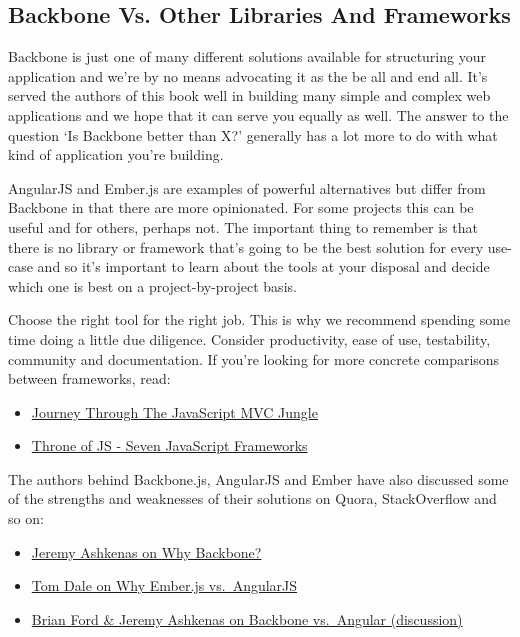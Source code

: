 \documentclass[9pt]{book}
\begin{document}
\subsection{Backbone Vs. Other Libraries And
Frameworks}\label{backbone-vs.-other-libraries-and-frameworks}

Backbone is just one of many different solutions available for
structuring your application and we're by no means advocating it as the
be all and end all. It's served the authors of this book well in
building many simple and complex web applications and we hope that it
can serve you equally as well. The answer to the question `Is Backbone
better than X?' generally has a lot more to do with what kind of
application you're building.

AngularJS and Ember.js are examples of powerful alternatives but differ
from Backbone in that there are more opinionated. For some projects this
can be useful and for others, perhaps not. The important thing to
remember is that there is no library or framework that's going to be the
best solution for every use-case and so it's important to learn about
the tools at your disposal and decide which one is best on a
project-by-project basis.

Choose the right tool for the right job. This is why we recommend
spending some time doing a little due diligence. Consider productivity,
ease of use, testability, community and documentation. If you're looking
for more concrete comparisons between frameworks, read:

\begin{itemize}
\itemsep1pt\parskip0pt
\item
  \href{http://coding.smashingmagazine.com/2012/07/27/journey-through-the-javascript-mvc-jungle/}{Journey
  Through The JavaScript MVC Jungle}
\item
  \href{http://blog.stevensanderson.com/2012/08/01/rich-javascript-applications-the-seven-frameworks-throne-of-js-2012/}{Throne
  of JS - Seven JavaScript Frameworks}
\end{itemize}

The authors behind Backbone.js, AngularJS and Ember have also discussed
some of the strengths and weaknesses of their solutions on Quora,
StackOverflow and so on:

\begin{itemize}
\itemsep1pt\parskip0pt
\item
  \href{http://backbonejs.org/\#FAQ-why-backbone}{Jeremy Ashkenas on Why
  Backbone?}
\item
  \href{http://www.quora.com/Ember-js/Which-one-of-angular-js-and-ember-js-is-the-better-choice/answer/Tom-Dale}{Tom
  Dale on Why Ember.js vs.~AngularJS}
\item
  \href{http://www.reddit.com/r/javascript/comments/17h22w/an_introduction_to_angular_for_backbone_developers/}{Brian
  Ford \& Jeremy Ashkenas on Backbone vs.~Angular (discussion)}
\end{itemize}
\end{document}
